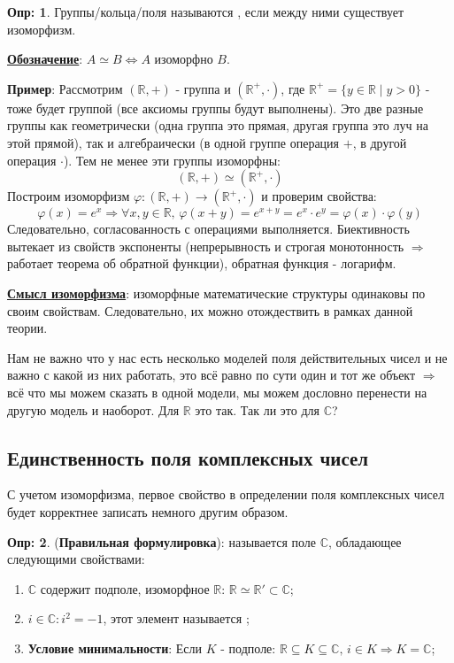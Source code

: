 \documentclass[12pt]{article}
\newcommand{\MR}{\mathbb{R}}
\newcommand{\MC}{\mathbb{C}}
\theoremstyle{definition}
\newtheorem{defn}{Опр:}
\begin{document}
\begin{defn}
	Группы/кольца/поля называются , если между ними существует изоморфизм.
\end{defn}
\textbf{\uline{Обозначение}}: $A\simeq B \Leftrightarrow A$ изоморфно $B$.

\textbf{Пример}: Рассмотрим $(\MR,+)$ - группа и $(\MR^{+},{\cdot})$, где $\MR^+ = \{y \in \MR \mid y > 0\}$ - тоже будет группой (все аксиомы группы будут выполнены). Это две разные группы как геометрически (одна группа это прямая, другая группа это луч на этой прямой), так и алгебраически (в одной группе операция $+$, в другой операция ${\cdot}$). Тем не менее эти группы изоморфны:
$$
	(\MR, +) \simeq (\MR^{+}, {\cdot})
$$
Построим изоморфизм $\varphi \colon (\MR, +) \to (\MR^{+}, {\cdot})$ и проверим свойства:
$$
	\varphi(x) = e^x \Rightarrow \forall x,y \in \MR, \, \varphi(x + y) = e^{x + y} = e^{x}{\cdot}e^{y} = \varphi(x){\cdot}\varphi(y)
$$
Следовательно, согласованность с операциями выполняется. Биективность вытекает из свойств экспоненты (непрерывность и строгая монотонность $\Rightarrow$ работает теорема об обратной функции), обратная функция - логарифм.

\textbf{\uline{Смысл изоморфизма}}: изоморфные математические структуры одинаковы по своим свойствам. Следовательно, их можно отождествить в рамках данной теории.

Нам не важно что у нас есть несколько моделей поля действительных чисел и не важно с какой из них работать, это всё равно по сути один и тот же объект $\Rightarrow$ всё что мы можем сказать в одной модели, мы можем дословно перенести на другую модель и наоборот. Для $\MR$ это так. Так ли это для $\MC$? 

\subsection*{Единственность поля комплексных чисел}

С учетом изоморфизма, первое свойство в определении поля комплексных чисел будет корректнее записать немного другим образом.
\begin{defn}(\textbf{Правильная формулировка}):
	 называется поле $\MC$, обладающее следующими свойствами:
	\begin{enumerate}[label=\arabic*)]
		\item $\MC$ содержит подполе, изоморфное $\MR$: $\MR \simeq \MR' \subset \MC$;
		\item $i \in \MC \colon i^2 = -1$, этот элемент называется ;
		\item \textbf{Условие минимальности}: Если $K$ - подполе: $\MR \subseteq K \subseteq \MC, \, i \in K \Rightarrow K = \MC$;
	\end{enumerate}
\end{defn} 
\end{document}
